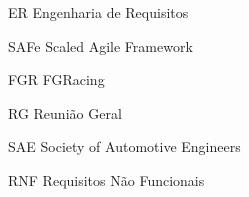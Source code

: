 \begin{siglas}
  \item[ER] Engenharia de Requisitos
  \item[SAFe] Scaled Agile Framework
  \item[FGR] FGRacing
  \item[RG] Reunião Geral
  \item[SAE] Society of Automotive Engineers
  \item[RNF] Requisitos Não Funcionais
\end{siglas}
